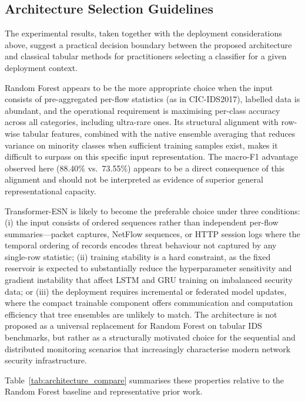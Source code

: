 \documentclass[5p,times]{elsarticle}
\begin{document}
	\subsection{Architecture Selection Guidelines}
	\label{subsec:selection}
	
	The experimental results, taken together with the deployment
	considerations above, suggest a practical decision boundary between
	the proposed architecture and classical tabular methods for
	practitioners selecting a classifier for a given deployment context.
	
	Random Forest appears to be the more appropriate choice when the input
	consists of pre-aggregated per-flow statistics (as in CIC-IDS2017),
	labelled data is abundant, and the operational requirement is
	maximising per-class accuracy across all categories, including
	ultra-rare ones. Its structural alignment with row-wise tabular
	features, combined with the native ensemble averaging that reduces
	variance on minority classes when sufficient training samples exist,
	makes it difficult to surpass on this specific input representation.
	The macro-F1 advantage observed here (88.40\% vs.\ 73.55\%) appears to
	be a direct consequence of this alignment and should not be interpreted
	as evidence of superior general representational capacity.
	
	Transformer-ESN is likely to become the preferable choice under three
	conditions: (i) the input consists of ordered sequences rather than
	independent per-flow summaries---packet captures, NetFlow sequences,
	or HTTP session logs where the temporal ordering of records encodes
	threat behaviour not captured by any single-row statistic; (ii)
	training stability is a hard constraint, as the fixed reservoir is
	expected to substantially reduce the hyperparameter sensitivity and
	gradient instability that affect LSTM and GRU training on imbalanced
	security data; or (iii) the deployment requires incremental or
	federated model updates, where the compact trainable component offers
	communication and computation efficiency that tree ensembles are
	unlikely to match. The architecture is not proposed as a universal
	replacement for Random Forest on tabular IDS benchmarks, but rather as
	a structurally motivated choice for the sequential and distributed
	monitoring scenarios that increasingly characterise modern network
	security infrastructure.
	
	Table~\ref{tab:architecture_compare} summarises these properties
	relative to the Random Forest baseline and representative prior work.
	
\end{document}

